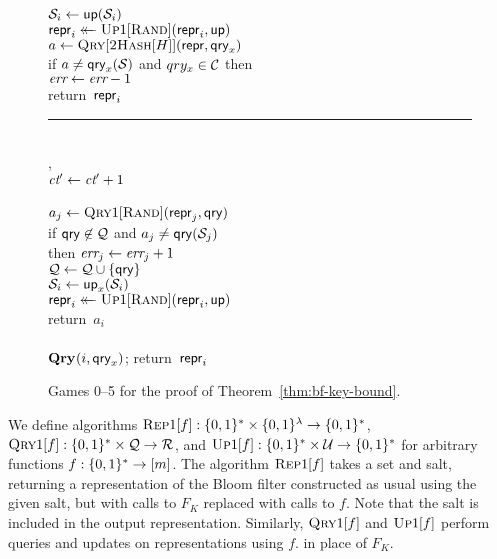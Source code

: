 \begin{figure}
{      $\mathcal{S}_i \gets \mathsf{up}(\mathcal{S}_i)$\\
      $\mathsf{repr}_i \mathrel{\leftarrow\mkern-14mu\leftarrow} \textsc{Up}1[\textsc{Rand}](\mathsf{repr}_i,\mathsf{up})$\\
      $a \gets \textsc{Qry}[\textsc{2Hash}[H]](\mathsf{repr}, \mathsf{qry}_x)$\\
      if $a \neq \mathsf{qry}_x(\mathcal{S})$ and $qry_x \in \mathcal{C}$ then\\
      \tab $\textit{err} \gets \textit{err}-1$\\
      return~$\mathsf{repr}_i$
    \\[3pt]
    \hspace*{-4pt}\rule{1.049\textwidth}{.4pt}
    \\[2pt]
    ,\hfill{}\hspace*{0pt}\\[2pt]
      $\textit{ct}' \gets \textit{ct}' + 1$\\
      \\
      \tab $a_j \gets \textsc{Qry}1[\textsc{Rand}](\mathsf{repr}_j, \mathsf{qry})$\\
      \tab if  $\mathsf{qry}\not\in\mathcal{Q}$ and $a_j \ne \mathsf{qry}(\mathcal{S}_j)$\\
      \tab\tab then $\textit{err}_j \gets \textit{err}_j + 1$\\
       $\mathcal{Q} \gets \mathcal{Q} \cup \{\mathsf{qry}\}$\\
      $\mathcal{S}_i \gets \mathsf{up}_x(\mathcal{S}_i)$\\
      $\mathsf{repr}_i \mathrel{\leftarrow\mkern-14mu\leftarrow} \textsc{Up}1[\textsc{Rand}](\mathsf{repr}_i,\mathsf{up})$\\
      return~$a_i$
    \\[2pt]
    \\[2pt]
      $\mathbf{Qry}\hspace{0.5pt}(i, \mathsf{qry}_x)$; return~$\mathsf{repr}_i$\\
  }
  \caption{Games 0--5 for the proof of
  Theorem~\ref{thm:bf-key-bound}.}
  \label{fig:bf-prf-correct}
\end{figure}

We define algorithms $\textsc{Rep}1[f]: \{0,1\}^* \times \{0,1\}^\lambda \to \{0,1\}^*$, $\textsc{Qry}1[f]: \{0,1\}^* \times \mathcal{Q} \to \mathcal{R}$, and $\textsc{Up}1[f]: \{0,1\}^* \times \mathcal{U} \to \{0,1\}^*$ for arbitrary functions $f: \{0,1\}^* \to [m]$. The algorithm $\textsc{Rep}1[f]$ takes a set and salt, returning a representation of the Bloom filter constructed as usual using the given salt, but with calls to $F_K$ replaced with calls to $f$. Note that the salt is included in the output representation. Similarly, $\textsc{Qry}1[f]$ and $\textsc{Up}1[f]$ perform queries and updates on representations using $f$. in place of $F_K$.

